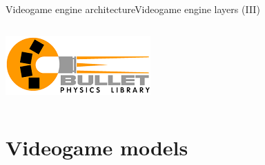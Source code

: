\documentclass[10pt,compress]{beamer} %
\begin{document}
\begin{frame}[plain]{Videogame engine architecture}{Videogame engine layers (III)}
\begin{columns}
			\centering\includegraphics[width=0.9\linewidth]{figs/bullet}
	\end{columns}
\end{frame}



\section{Videogame models}
\end{document}
